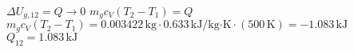 \( \Delta U_{g,12} = Q \rightarrow 0 \)  
\( m_g c_V (T_2 - T_1) = Q \)  
\( m_g c_V (T_2 - T_1) = 0.003422 \, \text{kg} \cdot 0.633 \, \text{kJ/kg·K} \cdot (500 \, \text{K}) = -1.083 \, \text{kJ} \)  
\( Q_{12} = 1.083 \, \text{kJ} \)